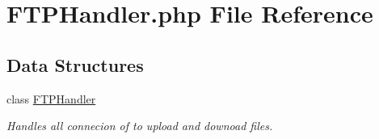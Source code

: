\hypertarget{_f_t_p_handler_8php}{}\section{F\+T\+P\+Handler.\+php File Reference}
\label{_f_t_p_handler_8php}
\subsection*{Data Structures}
\begin{DoxyCompactItemize}
\item 
class \hyperlink{class_f_t_p_handler}{F\+T\+P\+Handler}
\begin{DoxyCompactList}\small\item\em Handles all connecion of to upload and downoad files. \end{DoxyCompactList}\end{DoxyCompactItemize}
